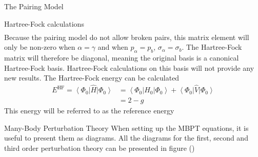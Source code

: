 \documentclass[twoside,english]{uiofysmaster}
\begin{document}
\begin{chapter}{The Pairing Model}
\begin{section}{Hartree-Fock calculations}
\begin{align}
 		\end{align}
 		Because the pairing model do not allow broken pairs, this matrix element will only be non-zero when $\alpha = \gamma$ and when $p_{\alpha} = p_{b}$, $\sigma_ \alpha = \sigma_b$. The Hartree-Fock matrix will therefore be diagonal, meaning the original basis is a canonical Hartree-Fock basis. Hartree-Fock calculations on this basis will not provide any new results. The Hartree-Fock energy can be calculated
 		\begin{align}
 			E^{\text{HF}} = \left< \Phi_0 \right| \hat H \left| \Phi_0 \right> &= \left< \Phi_0 \right| \hat H_0 \left| \Phi_0 \right> + \left< \Phi_0 \right| \hat V \left| \Phi_0 \right> \\
 			&= 2 - g 
 		\end{align}
 		This energy will be referred to as the reference energy 
 	\end{section}

	\begin{section}{Many-Body Perturbation Theory}
 		When setting up the MBPT equations, it is useful to present them as diagrams. All the diagrams for the first, second and third order perturbation theory can be presented in figure ()
 		

\end{section}
\end{chapter}
\end{document}
